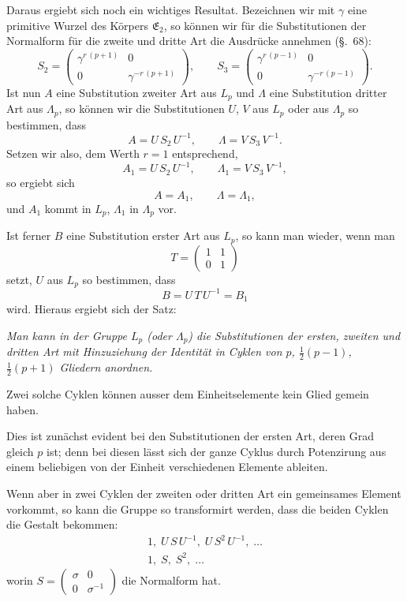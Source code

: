 \documentclass[12pt,a4paper]{article}
\begin{document}
Daraus ergiebt sich noch ein wichtiges Resultat. Bezeichnen wir mit $\gamma$ eine primitive Wurzel des Körpers $\mathfrak{E}_{2}$, so können wir für die Substitutionen der Normalform für die zweite und dritte Art die Ausdrücke annehmen (\S.~68):
\[
S_{2} = \begin{pmatrix}\gamma^{r\,(p+1)}&0\\0&\gamma^{-r\,(p+1)}\end{pmatrix},\qquad
S_{3} = \begin{pmatrix}\gamma^{r\,(p-1)}&0\\0&\gamma^{-r\,(p-1)}\end{pmatrix}.
\]
Ist nun $A$ eine Substitution zweiter Art aus $L_{p}$ und $\varLambda$ eine Substitution dritter Art aus $\varLambda_{p}$, so können wir die Substitutionen $U$, $V$ aus $L_{p}$ oder aus $\varLambda_{p}$ so bestimmen, dass
\[
A = U\,S_{2}\,U^{-1},\qquad \varLambda = V\,S_{3}\,V^{-1}.
\]
Setzen wir also, dem Werth $r = 1$ entsprechend,
\[
A_{1} = U\,S_{2}\,U^{-1},\qquad \varLambda_{1} = V\,S_{3}\,V^{-1},
\]
so ergiebt sich
\[
A = A_{1},\qquad \varLambda = \varLambda_{1},
\]
und $A_{1}$ kommt in $L_{p}$, $\varLambda_{1}$ in $\varLambda_{p}$ vor.

Ist ferner $B$ eine Substitution erster Art aus $L_{p}$, so kann man wieder, wenn man
\[
T = \begin{pmatrix}1&1\\0&1\end{pmatrix}
\]
setzt, $U$ aus $L_{p}$ so bestimmen, dass
\[
B = U\,T\,U^{-1} = B_{1}
\]
wird. Hieraus ergiebt sich der Satz:

\medskip\noindent
\emph{Man kann in der Gruppe $L_{p}$ (oder $\varLambda_{p}$) die Substitutionen der ersten, zweiten und dritten Art mit Hinzuziehung der Identität in Cyklen von $p$, $\frac{1}{2}(p-1)$, $\frac{1}{2}(p+1)$ Gliedern anordnen.}

Zwei solche Cyklen können ausser dem Einheitselemente kein Glied gemein haben.

Dies ist zunächst evident bei den Substitutionen der ersten Art, deren Grad gleich $p$ ist; denn bei diesen lässt sich der ganze Cyklus durch Potenzirung aus einem beliebigen von der Einheit verschiedenen Elemente ableiten.

Wenn aber in zwei Cyklen der zweiten oder dritten Art ein gemeinsames Element vorkommt, so kann die Gruppe so transformirt werden, dass die beiden Cyklen die Gestalt bekommen:
\begin{equation}\label{eq:69.11}
\tag{11}
\begin{aligned}
1,\; U\,S\,U^{-1},\; U\,S^{2}\,U^{-1},\; \ldots\\
1,\; S,\; S^{2},\; \ldots
\end{aligned}
\end{equation}
worin $S = \begin{pmatrix}\sigma&0\\0&\sigma^{-1}\end{pmatrix}$ die Normalform hat.
\end{document}
